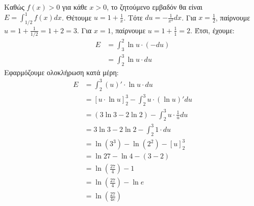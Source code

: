 \begin{alist}
    \item Καθώς $f(x) > 0$ για κάθε $x > 0$, το ζητούμενο εμβαδόν θα είναι $E = \int_{1/2}^{1} f(x)dx$.
    Θέτουμε $u = 1 + \frac{1}{x}$. Τότε $du = -\frac{1}{x^2}dx$.
    Για $x = \frac{1}{2}$, παίρνουμε $u = 1 + \frac{1}{1/2} = 1+2 = 3$.
    Για $x = 1$, παίρνουμε $u = 1 + \frac{1}{1} = 2$.
    Έτσι, έχουμε:
    \begin{align*}
        E &= \int_{3}^{2} \ln u \cdot (-du) \\
        &= \int_{2}^{3} \ln u \cdot du
    \end{align*}
    Εφαρμόζουμε ολοκλήρωση κατά μέρη:
    \begin{align*}
        E &= \int_{2}^{3} (u)' \cdot \ln u \cdot du \\
        &= [u \cdot \ln u]_{2}^{3} - \int_{2}^{3} u \cdot (\ln u)' du \\
        &= (3\ln3 - 2\ln2) - \int_{2}^{3} u \cdot \frac{1}{u} du \\
        &= 3\ln3 - 2\ln2 - \int_{2}^{3} 1 \cdot du \\
        &= \ln(3^3) - \ln(2^2) - [u]_{2}^{3} \\
        &= \ln27 - \ln4 - (3-2) \\
        &= \ln \left(\frac{27}{4}\right) - 1 \\
        &= \ln \left(\frac{27}{4}\right) - \ln e \\
        &= \ln \left(\frac{27}{4e}\right)
    \end{align*} 
\end{alist}
